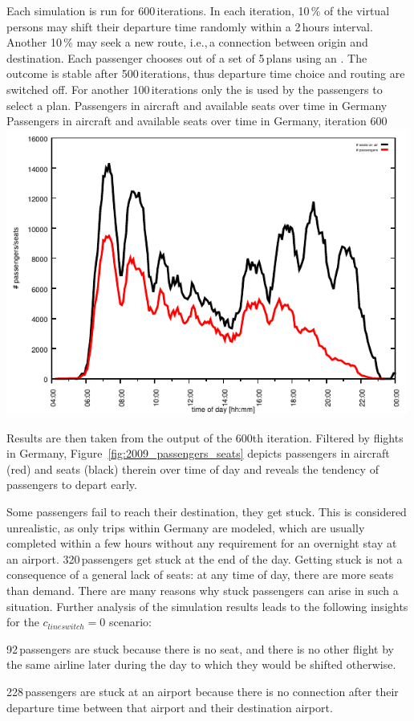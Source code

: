 Each simulation is run for 600\,iterations.
In each iteration, 10\,\% of the virtual persons may shift their departure time randomly within a 2\,hours interval.
Another 10\,\% may seek a new route, i.e.,\,a connection between origin and destination. 
Each passenger chooses out of a set of 5\,plans using an .
The outcome is stable after 500\,iterations, thus departure time choice and routing are switched off. 
For another 100\,iterations only the  is used by the passengers to select a plan. 
%
\createfigure%
{Passengers in aircraft and available seats over time in Germany}%
{Passengers in aircraft and available seats over time in Germany, iteration 600}%
{\label{fig:2009_passengers_seats}}%
{\includegraphics[width=0.99\textwidth, angle=0]{./extending/figures/air/in_vehicle_histogram_flight_1876_it_600.pdf}}%
{}


Results are then taken from the output of the 600th iteration. 
Filtered by flights in Germany, Figure~\ref{fig:2009_passengers_seats} depicts passengers in aircraft (red) and seats (black) therein over time of day
and reveals the tendency of passengers to depart early. 

Some passengers fail to reach their destination, they get stuck.   
This is considered unrealistic, as only trips within Germany are modeled, which are usually completed within a few hours without any requirement for an overnight stay at an airport. 
320\,passengers get stuck at the end of the day. 
Getting stuck is not a consequence of a general lack of seats: at any time of day, there are more seats than demand.  
%
There are many reasons why stuck passengers can arise in such a situation.
%
Further analysis of the simulation results leads to the following insights for the $c_{lineswitch} = 0$ scenario:
\begin{compactitem}
\item 92\,passengers are stuck because there is no seat, and there is no other flight by the same airline later during the day to which they would be shifted otherwise.
\item 228\,passengers are stuck at an airport because there is no connection after their departure time 
	between that airport and their destination airport. 
\end{compactitem}

